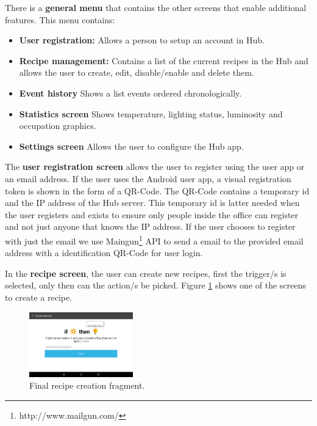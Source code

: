 \documentclass[conference]{IEEEtran}
\begin{document}
There is a \textbf{general menu} that contains the other screens that enable additional features. This menu contains:
\begin{itemize}
  \item \textbf{User registration:} Allows a person to setup an account in Hub.
  \item \textbf{Recipe management:} Contains a list of the current recipes in the Hub and allows the user to create, edit, disable/enable and delete them.
  
  \item \textbf{Event history} Shows a list events ordered chronologically.
  
  \item \textbf{Statistics screen} Shows temperature, lighting status, luminosity and occupation graphics.   
  
  \item \textbf{Settings screen} Allows the user to configure the Hub app.
\end{itemize}



The \textbf{user registration screen} allows the user to register using the user app or an email address.
If the user uses the Android user app, a visual registration token is shown in the form of a QR-Code. The QR-Code contains a temporary id and the IP address of the Hub server. This temporary id is latter needed when the user registers and exists to ensure only people inside the office can register and not just anyone that knows the IP address. If the user chooses to register with just the email we use Maingun\footnote{http://www.mailgun.com/} API to send a email to the provided email address with a identification QR-Code for user login.

In the \textbf{recipe screen}, the user can create new recipes, first the trigger/s is selected, only then can the action/s be picked. Figure \ref{screen_completed_recipe} shows one of the screens to create a recipe. 

\begin{figure}[h]
\centering
\includegraphics[width=0.4\textwidth]{Figures/screen_completed_recipe}
\caption{Final recipe creation fragment.}
\label{screen_completed_recipe}
\end{figure}
\end{document}
